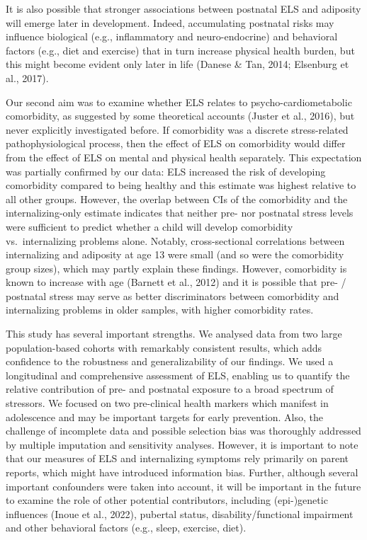 \documentclass[
  letterpaper,
  DIV=11,
  numbers=noendperiod]{scrreport}
\begin{document}
It is also possible that stronger associations between postnatal ELS and
adiposity will emerge later in development. Indeed, accumulating
postnatal risks may influence biological (e.g., inflammatory and
neuro-endocrine) and behavioral factors (e.g., diet and exercise) that
in turn increase physical health burden, but this might become evident
only later in life (Danese \& Tan, 2014; Elsenburg et al., 2017).

Our second aim was to examine whether ELS relates to
psycho-cardiometabolic comorbidity, as suggested by some theoretical
accounts (Juster et al., 2016), but never explicitly investigated
before. If comorbidity was a discrete stress-related pathophysiological
process, then the effect of ELS on comorbidity would differ from the
effect of ELS on mental and physical health separately. This expectation
was partially confirmed by our data: ELS increased the risk of
developing comorbidity compared to being healthy and this estimate was
highest relative to all other groups. However, the overlap between CIs
of the comorbidity and the internalizing-only estimate indicates that
neither pre- nor postnatal stress levels were sufficient to predict
whether a child will develop comorbidity vs.~internalizing problems
alone. Notably, cross-sectional correlations between internalizing and
adiposity at age 13 were small (and so were the comorbidity group
sizes), which may partly explain these findings. However, comorbidity is
known to increase with age (Barnett et al., 2012) and it is possible
that pre- / postnatal stress may serve as better discriminators between
comorbidity and internalizing problems in older samples, with higher
comorbidity rates.

This study has several important strengths. We analysed data from two
large population-based cohorts with remarkably consistent results, which
adds confidence to the robustness and generalizability of our findings.
We used a longitudinal and comprehensive assessment of ELS, enabling us
to quantify the relative contribution of pre- and postnatal exposure to
a broad spectrum of stressors. We focused on two pre-clinical health
markers which manifest in adolescence and may be important targets for
early prevention. Also, the challenge of incomplete data and possible
selection bias was thoroughly addressed by multiple imputation and
sensitivity analyses. However, it is important to note that our measures
of ELS and internalizing symptoms rely primarily on parent reports,
which might have introduced information bias. Further, although several
important confounders were taken into account, it will be important in
the future to examine the role of other potential contributors,
including (epi-)genetic influences (Inoue et al., 2022), pubertal
status, disability/functional impairment and other behavioral factors
(e.g., sleep, exercise, diet).
\end{document}
